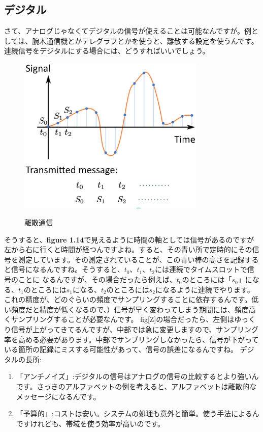 \subsection{デジタル}
さて、アナログじゃなくてデジタルの信号が使えることは可能なんですが。例としては、腕木通信機とかテレグラフとかを使うと、離散する設定を使うんです。連続信号をデジタルにする場合には、どうすればいいでしょう。
\begin{figure}[H]
    \centering
    \includegraphics[width=0.8\textwidth]{lesson1/discre_signal.eps}
    \label{fig: 1}
    \begin{center}
        \caption{離散通信}
    \end{center}
\end{figure}
そうすると、\textbf{figure 1.14}で見えるように時間の軸としては信号があるのですが左から右に行くと時間が経つんですよね。すると、その青い所で定時的にその信号を測定しています。その測定されていることが、この青い棒の高さを記録すると信号になるんですね。そうすると、$t_0$、$t_1$、$t_2$には連続でタイムスロットで信号のことに
なるんですが、その場合だったら例えば、$t_0$のところには「$s_0$」になる、$t_1$のところには$s_1$になる、$t_2$のところには$s_2$になるように連続でやります。これの精度が、どのぐらいの頻度でサンプリングすることに依存するんです。低い頻度だと精度が低くなるので、）信号が早く変わってしまう期間には、頻度高くサンプリングすることが必要なんです。
fig[Z]の場合だったら、左側はゆっくり信号が上がってきてるんですが、中部では急に変更しますので、サンプリング率を高める必要があります。中部でサンプリングしなかったら、信号が下がっている箇所の記録にミスする可能性があって、信号の誤差になるんですね。
デジタルの長所:
\begin{enumerate}
    \item 「アンチノイズ」:デジタルの信号はアナログの信号の比較するとより強いんです。さっきのアルファベットの例を考えると、アルファベットは離散的なメッセージになるんです。
    \item  「予算的」:コストは安い。システムの処理も意外と簡単。使う手法によるんですけれども、帯域を使う効率が高いのです。
\end{enumerate}

